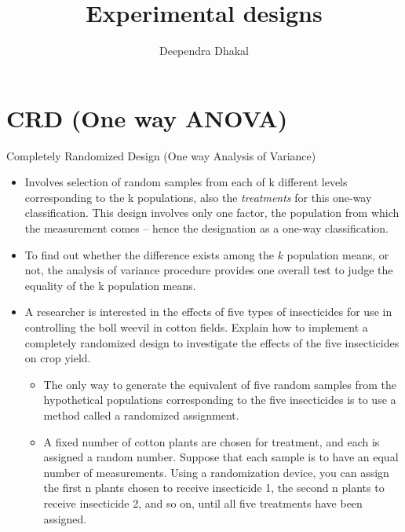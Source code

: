 \documentclass[
  ignorenonframetext,
  aspectratio=169]{beamer}
\title{Experimental designs}
\author{Deependra Dhakal}
\date{}
\institute{Assistant Professor \and Agriculture and Forestry
University \and \url{https://rookie.rbind.io}}
\providecommand{\tightlist}{%
  \setlength{\itemsep}{0pt}\setlength{\parskip}{0pt}}
\begin{document}
\frame{\titlepage}

\begin{frame}[allowframebreaks]
  \tableofcontents[hideallsubsections]
\end{frame}
\hypertarget{crd-one-way-anova}{%
\section{CRD (One way ANOVA)}\label{crd-one-way-anova}}

\begin{frame}{Completely Randomized Design (One way Analysis of
Variance)}
\protect\hypertarget{completely-randomized-design-one-way-analysis-of-variance}{}
\small

\begin{itemize}
\tightlist
\item
  Involves selection of random samples from each of k different levels
  corresponding to the k populations, also the \emph{treatments} for
  this one-way classification. This design involves only one factor, the
  population from which the measurement comes -- hence the designation
  as a one-way classification.
\item
  To find out whether the difference exists among the \(k\) population
  means, or not, the analysis of variance procedure provides one overall
  test to judge the equality of the k population means.
\item
  A researcher is interested in the effects of five types of
  insecticides for use in controlling the boll weevil in cotton fields.
  Explain how to implement a completely randomized design to investigate
  the effects of the five insecticides on crop yield.

  \begin{itemize}
  \footnotesize
  \item The only way to generate the equivalent of five random samples from the hypothetical populations corresponding to the five insecticides is to use a method called a randomized assignment.
  \item A fixed number of cotton plants are chosen for treatment, and each is assigned a random number. Suppose that each sample is to have an equal number of measurements. Using a randomization device, you can assign the first n plants chosen to receive insecticide 1, the second n plants to receive insecticide 2, and so on, until all five treatments have been assigned.
  \end{itemize}
\end{itemize}
\end{frame}
\end{document}

